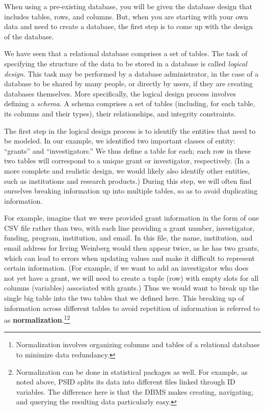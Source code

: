 \documentclass[]{krantz}
\begin{document}
When using a pre-existing database, you will be given the database
design that includes tables, rows, and columns. But, when you are
starting with your own data and need to create a database, the first
step is to come up with the design of the database.

We have seen that a relational database comprises a set of tables. The
task of specifying the structure of the data to be stored in a database
is called \emph{logical design}. This task may be performed by a
database administrator, in the case of a database to be shared by many
people, or directly by users, if they are creating databases themselves.
More specifically, the logical design process involves defining a
\emph{schema}. A schema comprises a set of tables (including, for each
table, its columns and their types), their relationships, and integrity
constraints.

The first step in the logical design process is to identify the entities
that need to be modeled. In our example, we identified two important
classes of entity: ``grants'' and ``investigators.'' We thus define a
table for each; each row in these two tables will correspond to a unique
grant or investigator, respectively. (In a more complete and realistic
design, we would likely also identify other entities, such as
institutions and research products.) During this step, we will often
find ourselves breaking information up into multiple tables, so as to
avoid duplicating information.

For example, imagine that we were provided grant information in the form
of one CSV file rather than two, with each line providing a grant
number, investigator, funding, program, institution, and email. In this
file, the name, institution, and email address for Irving Weinberg would
then appear twice, as he has two grants, which can lead to errors when
updating values and make it difficult to represent certain information.
(For example, if we want to add an investigator who does not yet have a
grant, we will need to create a tuple (row) with empty slots for all
columns (variables) associated with grants.) Thus we would want to break
up the single big table into the two tables that we defined here. This
breaking up of information across different tables to avoid repetition
of information is referred to as \textbf{normalization}.\footnote{Normalization
  involves organizing columns and tables of a relational database to
  minimize data redundancy.}\footnote{Normalization can be done in
  statistical packages as well. For example, as noted above, PSID splits
  its data into different files linked through ID variables. The
  difference here is that the DBMS makes creating, navigating, and
  querying the resulting data particularly easy.}
\end{document}
